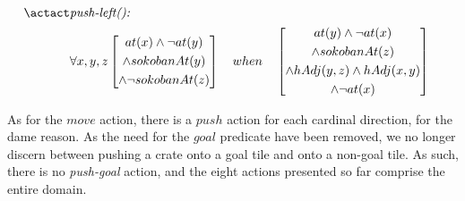\documentclass[../Master.tex]{subfiles}
\begin{document}
\begin{align*}
    \actact & \textit{push-left(): } & \\
    & \forall x, y, z
    \left[ 
        \begin{gathered}
            at(x) \land \neg at (y) \\
            \land sokobanAt(y) \\
            \land \neg sokobanAt(z) 
        \end{gathered}
    \right]
    \quad when \quad
    \left[
        \begin{gathered}
            at(y) \land \neg at(x) \\
            \land sokobanAt(z) \\ 
            \land hAdj (y,z) \land hAdj (x,y) \\
            \land \neg at(x)
        \end{gathered}
    \right]
\end{align*}

As for the $move$ action, there is a $push$ action for each cardinal direction, for the dame reason. As the need for the $goal$ predicate have been removed, we no longer discern between pushing a crate onto a goal tile and onto a non-goal tile. As such, there is no \textit{push-goal} action, and the eight actions presented so far comprise the entire domain.
\end{document}
